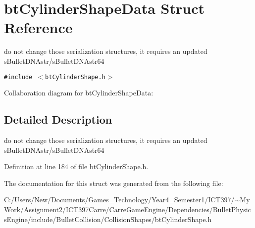 \hypertarget{structbt_cylinder_shape_data}{
\section{btCylinderShapeData Struct Reference}
\label{structbt_cylinder_shape_data}
}
do not change those serialization structures, it requires an updated sBulletDNAstr/sBulletDNAstr64  


{\tt \#include $<$btCylinderShape.h$>$}

Collaboration diagram for btCylinderShapeData:

\subsection{Detailed Description}
do not change those serialization structures, it requires an updated sBulletDNAstr/sBulletDNAstr64 

Definition at line 184 of file btCylinderShape.h.

The documentation for this struct was generated from the following file:\begin{CompactItemize}
\item 
C:/Users/New/Documents/Games\_\-Technology/Year4\_\-Semester1/ICT397/$\sim$My Work/Assignment2/ICT397Carre/CarreGameEngine/Dependencies/BulletPhysicsEngine/include/BulletCollision/CollisionShapes/btCylinderShape.h\end{CompactItemize}
